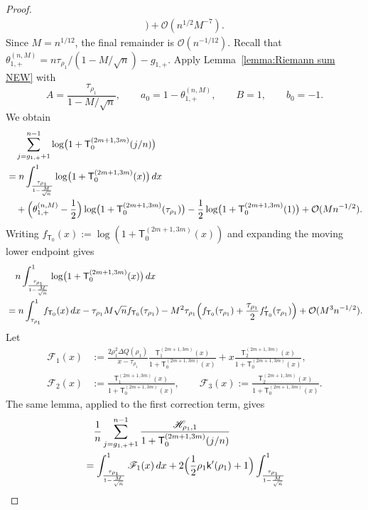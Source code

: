 \documentclass[a4paper]{article}
\numberwithin{equation}{section}
\begin{document}
\begin{proof}
\begin{align*}
\Bigr)
+\mathcal{O}(n^{1/2}M^{-7}).
\end{align*}
Since $M=n^{1/12}$, the final remainder is $\mathcal O(n^{-1/12})$.
Recall that
$\theta_{1,+}^{(n,M)}=n\tau_{\rho_1}/(1-M/\sqrt n)-g_{1,+}$.
Apply Lemma~\ref{lemma:Riemann sum NEW} with
\[
A=\frac{\tau_{\rho_1}}{1-M/\sqrt n},\qquad
a_0=1-\theta_{1,+}^{(n,M)},\qquad B=1,\qquad b_0=-1.
\]
We obtain
\begin{align*}
&\quad\sum_{j=g_{1,+}+1}^{n-1}
\log\bigl(1+\mathsf{T}_{0}^{(2m+1,3m)}(j/n)\bigr)
\\
&=
n\int_{\frac{\tau_{\rho_1}}{1-\frac{M}{\sqrt{n}}}}^1
\log\bigl(1+\mathsf{T}_{0}^{(2m+1,3m)}(x)\bigr)\,dx
\\
&\quad
+
\Bigl(\theta_{1,+}^{(n,M)}-\frac{1}{2}\Bigr)
\log\bigl(1+\mathsf{T}_{0}^{(2m+1,3m)}(\tau_{\rho_1})\bigr)
-
\frac{1}{2}\log\bigl(1+\mathsf{T}_{0}^{(2m+1,3m)}(1)\bigr)
+
\mathcal{O}(Mn^{-1/2}).
\end{align*}
Writing
$f_{\mathsf T_0}(x):=\log(1+\mathsf T_0^{(2m+1,3m)}(x))$ and expanding
the moving lower endpoint gives
\begin{align*}
&\quad n\int_{\frac{\tau_{\rho_1}}{1-\frac{M}{\sqrt{n}}}}^1
\log\bigl(1+\mathsf{T}_{0}^{(2m+1,3m)}(x)\bigr)\,dx
\\
&=
n\int_{\tau_{\rho_1}}^1
f_{\mathsf{T}_0}(x)\,dx
-\tau_{\rho_1}M\sqrt{n}f_{\mathsf{T}_0}(\tau_{\rho_1})
-M^2\tau_{\rho_1}\Bigl( 
f_{\mathsf{T}_0}(\tau_{\rho_1})
+\frac{\tau_{\rho_1}}{2}f_{\mathsf{T}_0}'(\tau_{\rho_1})\Bigr)
+\mathcal{O}(M^3n^{-1/2}). 
\end{align*}
Let 
\begin{align*}
\mathscr{F}_1(x)&:=
\frac{2\rho_1^2\Delta Q(\rho_1)}{x-\tau_{\rho_1}}
\frac{\mathsf{T}_{1}^{(2m+1,3m)}(x)}{1+\mathsf{T}_{0}^{(2m+1,3m)}(x)}
+
x
\frac{\mathsf{T}_{2}^{(2m+1,3m)}(x)}{1+\mathsf{T}_{0}^{(2m+1,3m)}(x)}, 
\\
\mathscr{F}_2(x)&:=
\frac{\mathsf{T}_{1}^{(2m+1,3m)}(x)}{1+\mathsf{T}_{0}^{(2m+1,3m)}(x)}, 
\qquad
\mathscr{F}_3(x):=
\frac{\mathsf{T}_{2}^{(2m+1,3m)}(x)}{1+\mathsf{T}_{0}^{(2m+1,3m)}(x)}. 
\end{align*}
The same lemma, applied to the first correction term, gives
\begin{align*}
&\quad \frac{1}{n}\sum_{j=g_{1,+}+1}^{n-1}
\frac{\mathscr{H}_{\rho_1,1}}{1+\mathsf{T}_{0}^{(2m+1,3m)}(j/n)}
\\
&=
\int_{\frac{\tau_{\rho_1}}{1-\frac{M}{\sqrt{n}}}}^{1}
\mathscr{F}_1(x)\,dx
+
2\Bigl(\frac{1}{2}\rho_1\mathsf{k}'(\rho_1)+1\Bigr)
\int_{\frac{\tau_{\rho_1}}{1-\frac{M}{\sqrt{n}}}}^{1}

\end{align*}
\end{proof}
\end{document}
